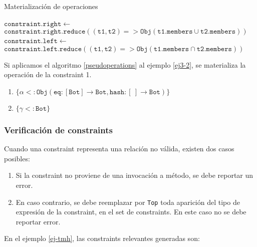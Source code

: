 \begin{algorithm}\captionsetup{labelsep=newline}
  \centering
  \caption{Materialización de operaciones}
  \label{pseudoperations}
    \begin{algorithmic}[1]
              \State $\mathtt{constraint.right\gets}$
              \State \ \ \ \ \ \ \ \ \ $\mathtt{constraint.right.reduce((t1,t2) => Obj(t1.members \cup t2.members))}$
            \EndIf
              \State $\mathtt{constraint.left\gets}$
              \State \ \ \ \ \ \ \ \ \ $\mathtt{constraint.left.reduce((t1,t2) => Obj(t1.members \cap t2.members))}$
            \EndIf
          \EndFor
      \EndFunction
    \end{algorithmic}
\end{algorithm}

Si aplicamos el algoritmo \ref{pseudoperations} al ejemplo \ref{ej3-2}, se materializa la operación de la constraint 1.

\begin{enumerate}
  \item $\mathtt{\{\alpha <: Obj(eq : [Bot] \rightarrow Bot, hash : [\ ] \rightarrow Bot)\}}$
  \item $\mathtt{\{\gamma <: Bot\}}$
\end{enumerate}

\subsubsection{Verificación de constraints} \label{propuestaVer}
Cuando una constraint representa una relación no válida, existen dos casos posibles:

\begin{enumerate}
  \item Si la constraint no proviene de una invocación a método, se debe reportar un error.
  \item En caso contrario, se debe reemplazar por \texttt{Top} toda aparición del tipo de expresión de la constraint, en el set de constraints. En este caso no se debe reportar error.
\end{enumerate}

En el ejemplo \ref{ej-tmh}, las constraints relevantes generadas son:

